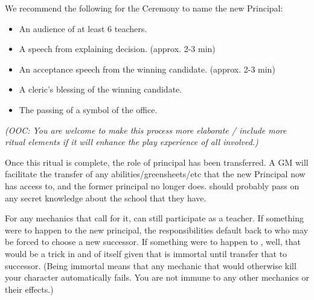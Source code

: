 \documentclass[green]{GL2020}
\begin{document}
We recommend the following for the Ceremony to name the new Principal:
\begin{itemize}
  \item An audience of at least 6 teachers.
  \item A speech from \cPrincipal{} explaining \cPrincipal{\their} decision. (approx. 2-3 min)
  \item An acceptance speech from the winning candidate. (approx. 2-3 min)
  \item A cleric’s blessing of the winning candidate.
  \item The passing of a symbol of the office.
\end{itemize}

\emph{(OOC: You are welcome to make this process more elaborate / include more ritual elements if it will enhance the play experience of all involved.)}

Once this ritual is complete, the role of principal has been transferred. A GM will facilitate the transfer of any abilities/greensheets/etc that the new Principal now has access to, and the former principal no longer does. \cPrincipal{} should probably pass on any secret knowledge about the school that they have. 

For any mechanics that call for it, \cPrincipal{} can still participate as a teacher. If something were to happen to the new principal, the responsibilities default back to \cPrincipal{} who may be forced to choose a new successor. If something were to happen to \cPrincipal{}, well, that would be a trick in and of itself given that \cPrincipal{} is immortal until \cPrincipal{\they} transfer\cPrincipal{\verbs} that to \cPrincipal{\their} successor. (Being immortal means that any mechanic that would otherwise kill your character automatically fails. You are not immune to any other mechanics or their effects.)
\end{document}
